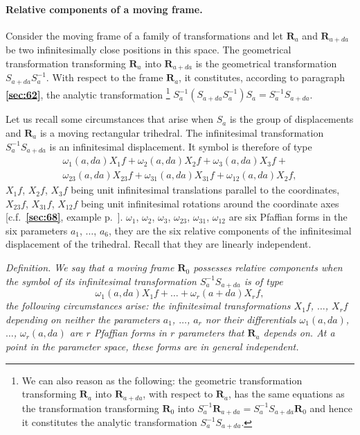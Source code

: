 \documentclass[leqno,11pt]{book}
\numberwithin{equation}{chapter}
\theoremstyle{shape1}
\theoremstyle{shapesmall}
\newcommand{\fsref}[1]{{\rm\textsection\textbf{\ref{sec:#1}}}}
\newcommand{\somespace}{\vspace{9pt}}
\begin{document}
\paragraph{Relative components of a moving frame.}
\label{sec:70}
Consider the moving frame of a family of transformations and let $\mathbf{R}_{a}$ and $\mathbf{R}_{a+da}$ be two infinitesimally close positions in this space. The geometrical transformation transforming $\mathbf{R}_{a}$ into $\mathbf{R}_{a+da}$ is the geometrical transformation $S_{a+da}S^{-1}_{a}$. With respect to the frame $\mathbf{R}_{a}$, it constitutes, according to paragraph \fsref{62}, the analytic transformation \footnote{We can also reason as the following: the geometric transformation transforming $\mathbf{R}_{a}$ into $\mathbf{R}_{a+da}$, with respect to $\mathbf{R}_{a}$, has the same equations as the transformation transforming $\mathbf{R}_{0}$ into $S_{a}^{-1}\mathbf{R}_{a+da}=S_{a}^{-1}S_{a+da}\mathbf{R}_{0}$ and hence it constitutes the analytic transformation $S_{a}^{-1}S_{a+da}$.} $S_{a}^{-1}(S_{a+da}S_{a}^{-1})S_{a}=S_{a}^{-1}S_{a+da}$.

Let us recall some circumstances that arise when $S_{a}$ is the group of displacements and $\mathbf{R}_{a}$ is a moving rectangular trihedral. The infinitesimal transformation $S_{a}^{-1}S_{a+da}$ is an infinitesimal displacement. It symbol is therefore of type
\begin{equation}
  \label{eq:5.11}
  \begin{multlined}    
    \omega_{1}(a,da)X_{1}f+\omega_{2}(a,da)X_{2}f+\omega_{3}(a,da)X_{3}f+\\
    \omega_{23}(a,da)X_{23}f+\omega_{31}(a,da)X_{31}f+\omega_{12}(a,da)X_{2}f,
  \end{multlined}
\end{equation}
$X_{1}f$, $X_{2}f$, $X_{3}f$ being unit infinitesimal translations parallel to the coordinates, $X_{23}f$, $X_{31}f$, $X_{12}f$ being unit infinitesimal rotations around the coordinate axes [c.f.~\fsref{68}, example p.~\pageref{sec:68}]. $\omega_{1}$, $\omega_{2}$, $\omega_{3}$, $\omega_{23}$, $\omega_{31}$, $\omega_{12}$ are six Pfaffian forms in the six parameters $a_{1}$, $\dots$, $a_{6}$, they are the six relative components of the infinitesimal displacement of the trihedral. Recall that they are linearly independent.

\somespace

\emph{Definition. We say that a moving frame $\mathbf{R}_{0}$ possesses relative components when the symbol of its infinitesimal transformation $S_{a}^{-1}S_{a+da}$ is of type
  \begin{equation}
    \label{eq:5.12}
    \omega_{1}(a,da)X_{1}f+\dots+\omega_{r}(a+da)X_{r}f,
  \end{equation}
the following circumstances arise: the infinitesimal transformations $X_{1}f$, $\dots$, $X_{r}f$ depending on neither the parameters $a_{1}$, $\dots$, $a_{r}$ nor their differentials $\omega_{1}(a,da)$, $\dots$, $\omega_{r}(a,da)$ are $r$ Pfaffian forms in $r$ parameters that $\mathbf{R}_{a}$ depends on. At a point in the parameter space, these forms are in general independent.}
\end{document}
